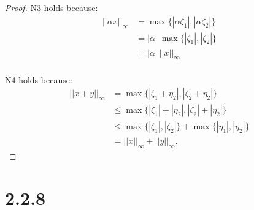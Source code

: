 \documentclass{article}
\begin{document}
\begin{proof}
  N3 holds because:
  \begin{align*}
    ||\alpha x||_\infty
    &= \max \lbrace |\alpha \zeta_1|, 
    |\alpha \zeta_2| \rbrace \\
    &= |\alpha| \: \max \lbrace |\zeta_1|, 
    |\zeta_2| \rbrace \\
    &= |\alpha| \: ||x||_\infty \\
  \end{align*}

  N4 holds because:
  \begin{align*}
    ||x+y||_\infty
    &= \max \lbrace |\zeta_1 + \eta_2|, 
    |\zeta_2 + \eta_2| \rbrace \\
    &\leq \max \lbrace |\zeta_1| + |\eta_2|, 
    |\zeta_2| + |\eta_2| \rbrace \\
    &\leq \max \lbrace |\zeta_1|, 
    |\zeta_2| \rbrace 
    + \max \lbrace |\eta_1|, 
    |\eta_2| \rbrace \\
    &= ||x||_\infty + ||y||_\infty.
  \end{align*}
  
\end{proof}

\section*{2.2.8}

\newpage
\end{document}
